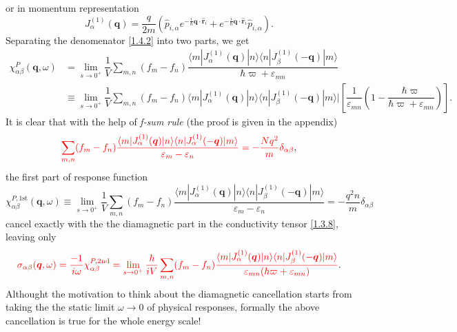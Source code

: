 \documentclass[10pt,nofootinbib,letterpaper]{revtex4}
\newcounter{Note}[section]
\newenvironment{Note}[1][]{{\par\normalfont\bfseries \underline{Note~\stepcounter{Note}\arabic{Note}.}~#1~~}}{\par}
\begin{document}
		or in momentum representation
		\begin{equation}\label{1.4.4}
			J^{(1)}_\alpha(\bm{q})=\dfrac{q}{2m}(\hat p_{i,\alpha} e^{-\frac i\hbar\bm{q}\cdot\hat{\bm{r}}_i}+e^{-\frac i\hbar\bm{q}\cdot\hat{\bm{r}}_i}\hat{p}_{i,\alpha}).
		\end{equation}
		Separating the denomenator \eqref{1.4.2} into two parts, we get
		\begin{align}
			\chi_{\alpha\beta}^P(\bm{q},\omega)&=\lim_{s \rightarrow0^+}\dfrac{1}{V}\sum_{m,n}(f_m-f_n)\dfrac{\langle m|J^{(1)}_\alpha(\bm{q})|n\rangle\langle n|J^{(1)}_\beta(-\bm{q})|m\rangle}{\hbar\varpi+\varepsilon_{mn}}\\
			&\equiv\lim_{s \rightarrow0^+}\dfrac{1}{V}\sum_{m,n}(f_m-f_n)\langle m|J^{(1)}_\alpha(\bm{q})|n\rangle\langle n|J^{(1)}_\beta(-\bm{q})|m\rangle|\left[\dfrac{1}{\varepsilon_{mn}}\left(1-\dfrac{\hbar\varpi}{\hbar\varpi+\varepsilon_{mn}}\right)\right].\label{1.4.5}
		\end{align}
		\indent It is clear that with the help of \emph{f-sum rule} (the proof is given in the appendix)
		\begin{equation}\label{1.4.6}
			{\color{red}\sum_{m,n}(f_m-f_n)\dfrac{\langle m|J^{(1)}_\alpha(\bm{q})|n\rangle\langle n|J^{(1)}_\alpha(-\bm{q})|m\rangle}{\varepsilon_m-\varepsilon_n}=-\frac{Nq^2}{m}\delta_{\alpha\beta}},
		\end{equation}
		the first part of response function
		\begin{equation}\label{1.4.7}
			\chi_{\alpha\beta}^{P,\text{1st}}(\bm{q},\omega)\equiv\lim_{s \rightarrow0^+}\dfrac{1}{V}\sum_{m,n}(f_m-f_n)\dfrac{\langle m|J^{(1)}_\alpha(\bm{q})|n\rangle\langle n|J^{(1)}_\beta(-\bm{q})|m\rangle}{\varepsilon_m-\varepsilon_n}=-\dfrac{q^2 n}{m}\delta_{\alpha\beta}
		\end{equation}
		cancel exactly with the the diamagnetic part in the conductivity tensor \eqref{1.3.8}, leaving only
		\begin{equation}\label{1.4.8}
			{\color{red}\sigma_{\alpha\beta}(\bm{q},\omega)=\dfrac{-1}{i\omega}\chi_{\alpha\beta}^{P,\text{2nd}}=\lim_{s \rightarrow0^+}\dfrac{\hbar}{iV}\sum_{m,n}(f_m-f_n)\dfrac{\langle m|J^{(1)}_\alpha(\bm{q})|n\rangle\langle n|J^{(1)}_\beta(-\bm{q})|m\rangle}{\varepsilon_{mn}(\hbar\varpi+\varepsilon_{mn})}}.
		\end{equation}
		\begin{Note}
			Althought the motivation to think about the diamagnetic cancellation starts from taking the the static limit $\omega \rightarrow 0$ of physical responses, formally the above cancellation is true for the whole energy scale!
		\end{Note}
\end{document}
